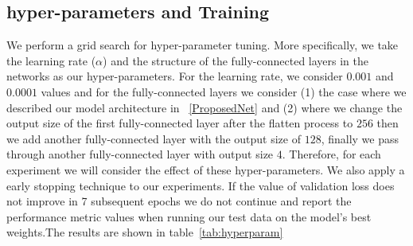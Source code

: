 \documentclass{article} %
\begin{document}
\subsection{hyper-parameters and Training}
We perform a grid search for hyper-parameter tuning. More specifically, we take the learning rate ($\alpha$) and the structure of the fully-connected layers in the networks as our hyper-parameters. For the learning rate, we consider $0.001$ and $0.0001$ values and for the fully-connected layers we consider (1) the case where we described our model architecture in ~\ref{ProposedNet} and (2) where we change the output size of the first fully-connected layer after the flatten process to $256$ then we add another fully-connected layer with the output size of $128$, finally we pass through another fully-connected layer with output size $4$. Therefore, for each experiment we will consider the effect of these hyper-parameters. We also apply a early stopping technique to our experiments. If the value of validation loss does not improve in 7 subsequent epochs we do not continue and report the performance metric values when running our test data on the model's best weights.The results are shown in table~\ref{tab:hyperparam}
\end{document}
